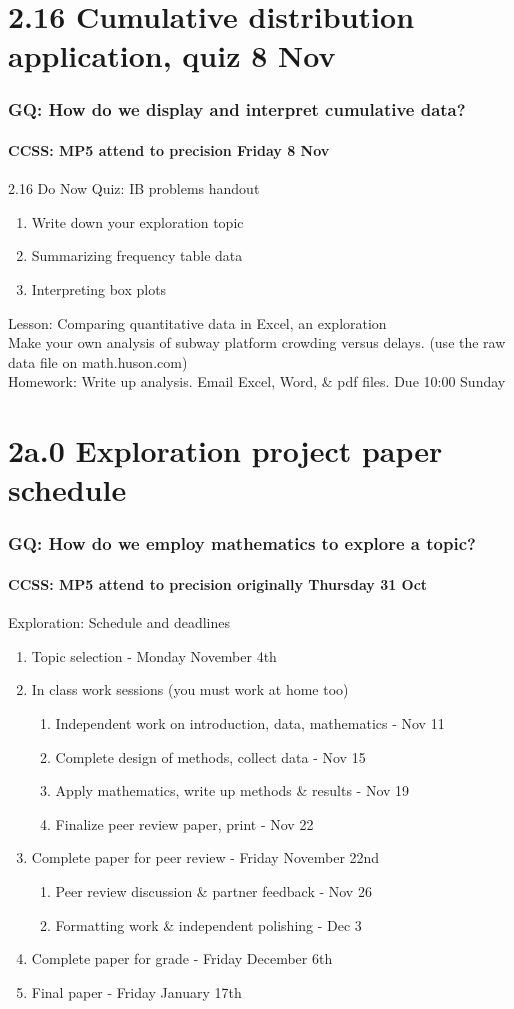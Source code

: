 \documentclass{beamer}
\begin{document}
\section{2.16 Cumulative distribution application, quiz 8 Nov}
\frame
{
  \frametitle{GQ: How do we display and interpret cumulative data?}
  \framesubtitle{CCSS: MP5 attend to precision \hfill \alert{Friday 8 Nov}}

  \begin{block}{2.16 Do Now Quiz: IB problems handout}
  \begin{enumerate}
      \item Write down your exploration topic 
      \item Summarizing frequency table data
      \item Interpreting box plots
  \end{enumerate}
  \end{block}
  Lesson: Comparing quantitative data in Excel, an exploration\\
  Make your own analysis of subway platform crowding versus delays. (use the raw data file on math.huson.com) \\ \smallskip
  Homework: Write up analysis. Email Excel, Word, \& pdf files. Due 10:00 Sunday
}

\section{2a.0 Exploration project paper schedule}
\frame
{
  \frametitle{GQ: How do we employ mathematics to explore a topic?}
  \framesubtitle{CCSS: MP5 attend to precision \hfill \alert{originally Thursday 31 Oct}}
  \begin{block}{Exploration: Schedule and deadlines}
    \begin{enumerate}
      \item Topic selection - Monday November 4th
      \item In class work sessions (you must work at home too)
      \begin{enumerate}
        \item Independent work on introduction, data, mathematics - Nov 11
        \item Complete design of methods, collect data - Nov 15
        \item Apply mathematics, write up methods \& results - Nov 19
        \item Finalize peer review paper, print - Nov 22
      \end{enumerate}
      \item Complete paper for peer review - Friday November 22nd
      \begin{enumerate}
        \item Peer review discussion \& partner feedback - Nov 26
        \item Formatting work \& independent polishing - Dec 3
      \end{enumerate}
      \item Complete paper for grade - Friday December 6th
      \item Final paper - Friday January 17th
    \end{enumerate}
    \end{block}
}
\end{document}
